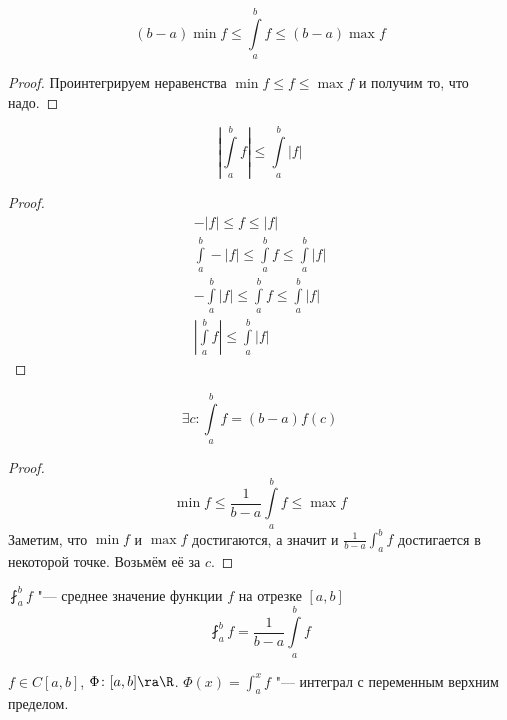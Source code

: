 \begin{conseq}
	\[ (b - a)\min f \le \int\limits_a^b f \le (b - a)\max f \]
\end{conseq}
\begin{proof}
	Проинтегрируем неравенства $\min f \le f \le \max f$ и получим то, что надо.
\end{proof}

\begin{conseq}
	\[ \left| \int\limits_a^b f \right| \le \int\limits_a^b |f| \]
\end{conseq}
\begin{proof}
	\begin{gather*}
		 -|f| \le f \le |f| \\
		 \int\limits_a^b -|f| \le \int\limits_a^b f \le \int\limits_a^b |f| \\
		 -\int\limits_a^b |f| \le \int\limits_a^b f \le \int\limits_a^b |f| \\
		 \left|\int\limits_a^b f \right| \le \int\limits_a^b |f|
	 \end{gather*}
\end{proof}

\begin{conseq}
	\[ \exists c\colon \int\limits_a^b f = (b - a)f(c) \]
\end{conseq}
\begin{proof}
	\[ \min f \le \frac{1}{b - a} \int\limits_a^b f \le \max f \]
	Заметим, что $\min f$ и $\max f$ достигаются, а значит и $\frac{1}{b - a} \int_a^b f$ достигается в некоторой точке. Возьмём её за $c$.
\end{proof}

\begin{Def}
	$\fint_a^b f$ "--- среднее значение функции $f$ на отрезке $[a, b]$
	\[ \fint_a^b f = \frac{1}{b - a} \int\limits_a^b f\]
\end{Def}

\begin{Def}
	$f \in C[a, b]$, $\Phi\colon [a, b] \ra \R$.
	$\Phi (x) = \int_a^x f$ "--- интеграл с переменным верхним пределом.
\end{Def}

